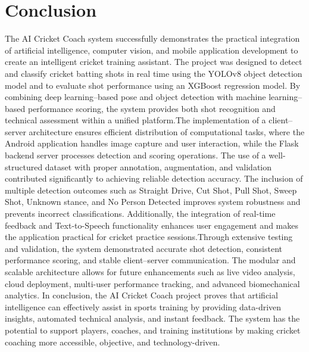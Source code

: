 \chapter{Conclusion}
\label{C9} %
The AI Cricket Coach system successfully demonstrates the practical integration of artificial intelligence, computer vision, and mobile application development to create an intelligent cricket training assistant. The project was designed to detect and classify cricket batting shots in real time using the YOLOv8 object detection model and to evaluate shot performance using an XGBoost regression model. By combining deep learning–based pose and object detection with machine learning–based performance scoring, the system provides both shot recognition and technical assessment within a unified platform.The implementation of a client–server architecture ensures efficient distribution of computational tasks, where the Android application handles image capture and user interaction, while the Flask backend server processes detection and scoring operations. The use of a well-structured dataset with proper annotation, augmentation, and validation contributed significantly to achieving reliable detection accuracy. The inclusion of multiple detection outcomes such as Straight Drive, Cut Shot, Pull Shot, Sweep Shot, Unknown stance, and No Person Detected improves system robustness and prevents incorrect classifications. Additionally, the integration of real-time feedback and Text-to-Speech functionality enhances user engagement and makes the application practical for cricket practice sessions.Through extensive testing and validation, the system demonstrated accurate shot detection, consistent performance scoring, and stable client–server communication. The modular and scalable architecture allows for future enhancements such as live video analysis, cloud deployment, multi-user performance tracking, and advanced biomechanical analytics.
In conclusion, the AI Cricket Coach project proves that artificial intelligence can effectively assist in sports training by providing data-driven insights, automated technical analysis, and instant feedback. The system has the potential to support players, coaches, and training institutions by making cricket coaching more accessible, objective, and technology-driven.